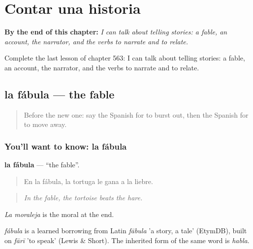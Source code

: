 
\chapter{Contar una historia}
\label{ch:es-contar-una-historia}

\begin{chapteropening}
\textbf{By the end of this chapter:} \emph{I can talk about telling stories: a fable, an account, the narrator, and the verbs to narrate and to relate.}

Complete the last lesson of chapter 563: I can talk about telling stories: a fable, an account, the narrator, and the verbs to narrate and to relate.
\end{chapteropening}

\section[la fábula]{la fábula — the fable}

\label{lesson:ES-C563-fabula}



\begin{quote}
Before the new one: say the Spanish for to burst out, then the Spanish for to move away.
\end{quote}

\subsection*{You'll want to know: la fábula}
\textbf{la fábula} — \textquotedblleft{}the fable\textquotedblright{}.

\begin{quote}
En la fábula, la tortuga le gana a la liebre.
\end{quote}

\begin{quote}
\emph{In the fable, the tortoise beats the hare.}
\end{quote}

\emph{La moraleja} is the moral at the end.

\begin{cousinweb}
\emph{fábula} is a learned borrowing from Latin \emph{fābula} 'a story, a tale' (EtymDB), built on \emph{fārī} 'to speak' (Lewis \& Short). The inherited form of the same word is \emph{habla}.
\end{cousinweb}

